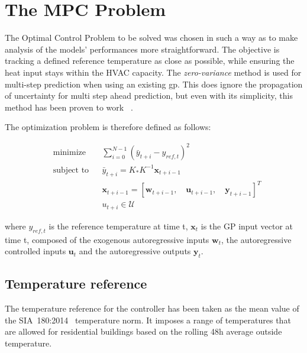 \section{The MPC Problem}

The Optimal Control Problem to be solved was chosen in such a way as to make
analysis of the models' performances more straightforward. The objective is
tracking a defined reference temperature as close as possible, while ensuring
the heat input stays within the HVAC capacity. The \textit{zero-variance} method
is used for multi-step prediction when using an existing \acrshort{gp}. This
does ignore the propagation of uncertainty for multi step ahead prediction, but
even with its simplicity, this method has been proven to work
~\cite{kocijanModellingControlDynamic2016,jainLearningControlUsing2018,
pleweSupervisoryModelPredictive2020}.

The optimization problem is therefore defined as follows:

\begin{subequations}\label{eq:optimal_control_problem}
    \begin{align}
        & \text{minimize}
        & & \sum_{i=0}^{N-1} (\bar{y}_{t+i} - y_{ref, t})^2 \\
        & \text{subject to}
        & & \bar{y}_{t+i} = K_*K^{-1}\mathbf{x}_{t+i-1} \\
        &&& \mathbf{x}_{t+i-1} = \left[\mathbf{w}_{t+i-1},\quad
        \mathbf{u}_{t+i-1},\quad \mathbf{y}_{t+i-1}\right]^T \\
        \label{eq:components}
        &&& u_{t+i} \in \mathcal{U}
    \end{align}
\end{subequations}

where $y_{ref, t}$ is the reference temperature at time t, $\mathbf{x}_{t}$ is
the GP input vector at time t, composed of the exogenous autoregressive inputs
$\mathbf{w}_{t}$, the autoregressive controlled inputs $\mathbf{u}_{t}$ and the
autoregressive outputs $\mathbf{y}_{t}$.

\subsection{Temperature reference}

The temperature reference for the controller has been taken as the mean value of
the SIA~180:2014~\cite{sia180:2014ProtectionThermiqueProtection2014} temperature
norm. It imposes a range of temperatures that are allowed for residential
buildings based on the rolling 48h average outside temperature.


